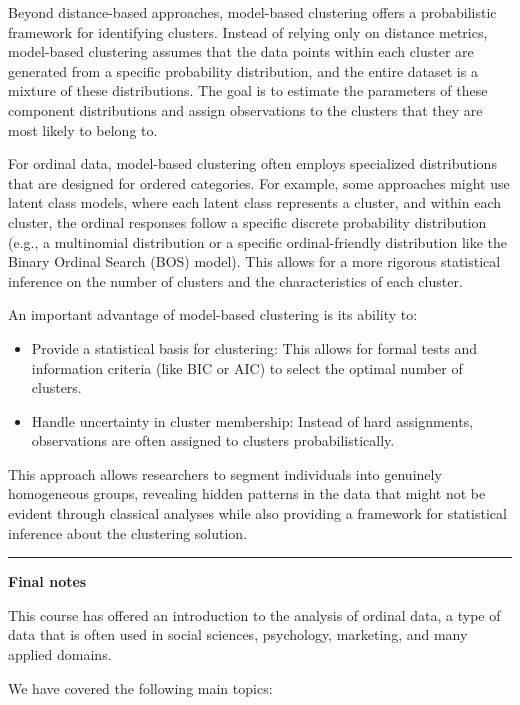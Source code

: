 \documentclass[
  letterpaper,
  DIV=11,
  numbers=noendperiod]{scrartcl}
\begin{document}
Beyond distance-based approaches, model-based clustering offers a
probabilistic framework for identifying clusters. Instead of relying
only on distance metrics, model-based clustering assumes that the data
points within each cluster are generated from a specific probability
distribution, and the entire dataset is a mixture of these
distributions. The goal is to estimate the parameters of these component
distributions and assign observations to the clusters that they are most
likely to belong to.

For ordinal data, model-based clustering often employs specialized
distributions that are designed for ordered categories. For example,
some approaches might use latent class models, where each latent class
represents a cluster, and within each cluster, the ordinal responses
follow a specific discrete probability distribution (e.g., a multinomial
distribution or a specific ordinal-friendly distribution like the Binary
Ordinal Search (BOS) model). This allows for a more rigorous statistical
inference on the number of clusters and the characteristics of each
cluster.

An important advantage of model-based clustering is its ability to:

\begin{itemize}
\item
  Provide a statistical basis for clustering: This allows for formal
  tests and information criteria (like BIC or AIC) to select the optimal
  number of clusters.
\item
  Handle uncertainty in cluster membership: Instead of hard assignments,
  observations are often assigned to clusters probabilistically.
\end{itemize}

This approach allows researchers to segment individuals into genuinely
homogeneous groups, revealing hidden patterns in the data that might not
be evident through classical analyses while also providing a framework
for statistical inference about the clustering solution.

\begin{center}\rule{0.5\linewidth}{0.5pt}\end{center}

\textbf{Final notes}

This course has offered an introduction to the analysis of ordinal data,
a type of data that is often used in social sciences, psychology,
marketing, and many applied domains.

We have covered the following main topics:
\end{document}
